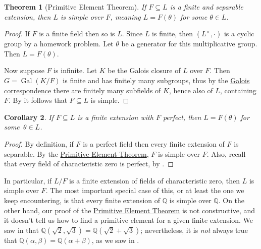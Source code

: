 \documentclass[12pt]{report}
\newtheorem{theorem}{Theorem}[chapter]
\newtheorem{corollary}[theorem]{Corollary}
\numberwithin{equation}{section}
\numberwithin{theorem}{chapter}
\theoremstyle{definition}
\newtheorem*{basic properties}{Basic Properties}
\newtheorem*{Important Remark}{Important Remark}
\DeclareMathOperator{\Gal}{Gal}
\begin{document}
\begin{theorem}[Primitive Element Theorem]\label{primitive element theorem}
If $F \subseteq L$ is a finite and separable extension, then $L$ is simple over $F$, meaning $L=F(\theta)$ for some $\theta \in L$.\end{theorem}

\begin{proof}
If $F$ is a finite field then so is $L$. Since $L$ is finite, then $(L^\times,\cdot)$ is a cyclic group by a homework problem. Let $\theta$ be a generator for this multiplicative group. Then $L=F(\theta)$.

Now suppose $F$ is infinite. Let $K$ be the Galois closure of $L$ over $F$. Then $G=\Gal(K/F)$ is finite and has finitely many subgroups, thus by the \hyperref[Fundamental Theorem of Galois Theory]{Galois correspondence} there are finitely many subfields of $K$, hence also of $L$, containing $F$. By  it follows that $F \subseteq L$ is simple.
\end{proof}


\begin{corollary}\label{finite extensions of char 0 fields are simple}
	If $F \subseteq L$ is a finite extension with $F$ perfect, then $L=F(\theta)$ for some~$\theta \in L$. 
\end{corollary}

\begin{proof}
	By definition, if $F$ is a perfect field then every finite extension of $F$ is separable. By the \hyperref[primitive element theorem]{Primitive Element Theorem}, $F$ is simple over $F$. Also, recall that every field of characteristic zero is perfect, by .
\end{proof}

In particular, if $L/F$ is a finite extension of fields of characteristic zero, then $L$ is simple over $F$.
The most important special case of this, or at least the one we keep encountering, is that every finite extension of $\mathbb{Q}$ is simple over $\mathbb{Q}$. On the other hand, our proof of the \hyperref[primitive element theorem]{Primitive Element Theorem} is not constructive, and it doesn't tell us how to find a primitive element for a given finite extension. 
We saw in  that $\mathbb{Q}(\sqrt{2},\sqrt{3}) = \mathbb{Q}(\sqrt{2}+\sqrt{3})$; nevertheless, it is \emph{not} always true that $\mathbb{Q}(\alpha, \beta) = \mathbb{Q}(\alpha+\beta)$, as we saw in .
\end{document}
